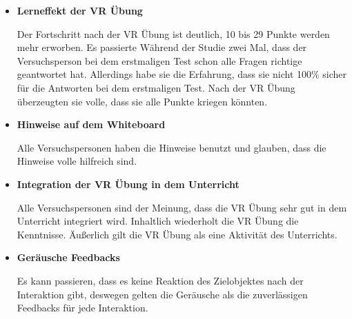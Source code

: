 \begin{itemize}
    \item \textbf{Lerneffekt der VR Übung}
    
    Der Fortschritt nach der VR Übung ist deutlich, 10 bis 29 Punkte werden mehr erworben. Es passierte Während der Studie zwei Mal, dass der Versuchsperson bei dem erstmaligen Test schon alle Fragen richtige geantwortet hat. Allerdings habe sie die Erfahrung, dass sie nicht 100\% sicher für die Antworten bei dem erstmaligen Test. Nach der VR Übung überzeugten sie volle, dass sie alle Punkte kriegen könnten.
    
    \item \textbf{Hinweise auf dem Whiteboard}
    
    Alle Versuchspersonen haben die Hinweise benutzt und glauben, dass die Hinweise volle hilfreich sind.
    
    \item \textbf{Integration der VR Übung in dem Unterricht}
    
    Alle Versuchspersonen sind der Meinung, dass die VR Übung sehr gut in dem Unterricht integriert wird. Inhaltlich wiederholt die VR Übung die Kenntnisse. Äußerlich gilt die VR Übung als eine Aktivität des Unterrichts.
    
    \item \textbf{Geräusche Feedbacks}
    
    Es kann passieren, dass es keine Reaktion des Zielobjektes nach der Interaktion gibt, deswegen gelten die Geräusche als die zuverlässigen Feedbacks für jede Interaktion.
    
    
\end{itemize}

